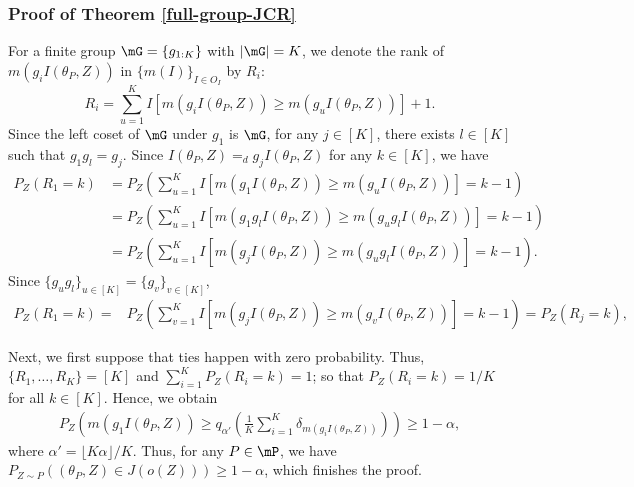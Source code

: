 \documentclass[english]{article}
\begin{document}
\subsubsection{Proof of Theorem \ref{full-group-JCR}}\label{proof:full-group-JCR}
For a finite group $\mG = \{g_{1:K}\}$ with $|\mG|=K$, we denote the rank of $m(g_iI(\theta_P,Z))$ in $\{m(I)\}_{I \in O_I}$ by $R_i$:
$$R_i
    = \sum_{u=1}^K I
[ m(g_iI(\theta_P,Z)) \ge m(g_uI(\theta_P,Z)) ] + 1.
$$
Since the left coset of $\mG$ under $g_1$ is $\mG$, 
for any $j \in [K]$, there exists $l \in [K]$ such that $g_1g_l = g_j$. 
Since $I(\theta_P,Z) =_d g_jI(\theta_P,Z)$ for any $k \in [K]$, we have
\begin{align*}
    P_Z(R_1 = k)
    &= P_Z\left(\sum_{u=1}^K I
[ m(g_1I(\theta_P,Z)) \ge m(g_uI(\theta_P,Z)) ] = k-1\right)\\
    &= P_Z\left(\sum_{u=1}^K I
[ m(g_1g_lI(\theta_P,Z)) \ge m(g_ug_lI(\theta_P,Z)) ] = k-1\right) \\
    &= P_Z\left(\sum_{u=1}^K I
[ m(g_jI(\theta_P,Z)) \ge m(g_ug_lI(\theta_P,Z)) ] = k-1\right).
\end{align*}
Since $\{g_u g_l\}_{u\in[K]} = \{g_v\}_{v\in[K]}$,
\begin{align*}
    P_Z(R_1 = k)
    =& P_Z\left(\sum_{v=1}^K I
[ m(g_jI(\theta_P,Z)) \ge m(g_vI(\theta_P,Z)) ] = k-1\right) 
    = P_Z(R_j = k),
\end{align*}

Next, we first suppose that ties happen with zero probability.
Thus, $\{R_1,\ldots,R_K\} = [K]$
and $\sum_{i=1}^K P_Z(R_i = k) = 1$;
so that 
$P_Z(R_i = k) = 1/K$
for all $k \in [K]$. 
Hence, we obtain
\begin{align}\label{fe}
    P_Z\left(m(g_1I(\theta_P, Z)) \ge q_{\alpha'}
\left(\frac{1}{K}\sum_{i=1}^K \delta_{m(g_iI(\theta_P, Z))}\right)\right) \ge 1 - \alpha,
\end{align}
where $\alpha' = {\lfloor K\alpha\rfloor}/{K}$. Thus, for any $P \in \mP$, 
we have
$
P_{Z \sim P}((\theta_P, Z) \in J(o(Z))) \ge 1 - \alpha$,
which finishes the proof.
\end{document}
